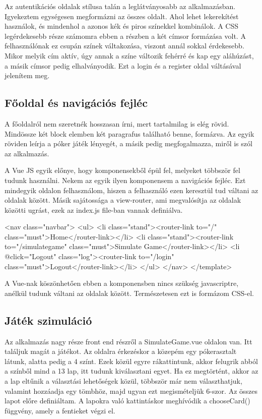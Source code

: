 Az autentikációs oldalak stílusa talán a leglátványosabb az alkalmazásban. Igyekeztem egységesen megformázni az összes oldalt. Ahol lehet lekerekítést használok, és mindenhol a azonos kék és piros színekkel kombinálok. A CSS legérdekesebb része számomra ebben a részben a két címsor formázása volt. A felhasználónak ez csupán színek váltakozása, viszont annál sokkal érdekesebb. Mikor melyik cím aktív, úgy annak a színe változik fehérré és kap egy aláhúzást, a másik címsor pedig elhalványodik. Ezt a login és a register oldal váltásával jelenítem meg.


\subsection{Főoldal és navigációs fejléc}
A főoldalról nem szeretnék hosszasan írni, mert tartalmilag is elég rövid. Mindössze két block elemben két paragrafus található benne, formázva. Az egyik röviden leírja a póker játék lényegét, a másik pedig megfogalmazza, miről is szól az alkalmazás.

A Vue JS egyik előnye, hogy komponensekből épül fel, melyeket többször fel tudunk használni. Nekem az egyik ilyen komponensem a navigációs fejléc. Ezt mindegyik oldalon felhasználom, hiszen a felhasználó ezen keresztül tud váltani az oldalak között. Másik sajátossága a view-router, ami megvalósítja az oldalak közötti ugrást, ezek az index.js file-ban vannak definiálva.

\begin{python}
<nav class="navbar">
  <ul>
    <li class="stand"><router-link to="/" class="must">Home</router-link></li>
    <li class="stand"><router-link to="/simulategame" class="must">Simulate Game</router-link></li>
    <li @click="Logout" class="log"><router-link to="/login" class="must">Logout</router-link></li>
  </ul>
</nav>
</template>
\end{python}

A Vue-nak köszönhetően ebben a komponensben nincs szükség javascriptre, anélkül tudunk váltani az oldalak között. Természetesen ezt is formázom CSS-el.

\subsection{Játék szimuláció}
Az alkalmazás nagy része front end részről a SimulateGame.vue oldalon van. Itt találjuk magát a játékot. Az oldalra érkezéskor a közepém egy pókerasztalt látunk, alatta pedig a 4 színt. Ezek közül egyre rákattintunk, akkor felugrik abból a színből mind a 13 lap, itt tudunk kiválasztani egyet. Ha ez megtörtént, akkor az a lap eltűnik a választási lehetőségek közül, többször már nem választhatjuk, valamint hozzáadja egy tömbhöz, majd ugyan ezt megismételjük 6-szor. Az összes lapot előre definiáltam. A lapokra való kattintáskor meghívódik a chooseCard() függvény, amely a fentieket végzi el.

